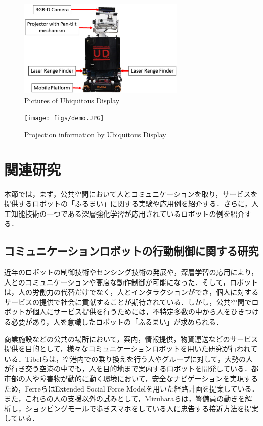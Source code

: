 \documentclass[12pt]{sonota/aislab}
\begin{document}
\begin{figure}[t]
\begin{center}
\includegraphics[clip, width=8cm]{figs/ud_with_kinectv2.eps}
\caption{Pictures of Ubiquitous Display}
\label{UD}
\end{center}
\end{figure}

\begin{figure}[t]
\begin{center}
\texttt{[image: figs/demo.JPG]}
\caption{Projection information by Ubiquitous Display}
\label{projection}
\end{center}
\end{figure}

\section{関連研究}
本節では，まず，公共空間において人とコミュニケーションを取り，サービスを提供するロボットの「ふるまい」に関する実験や応用例を紹介する．さらに，人工知能技術の一つである深層強化学習が応用されているロボットの例を紹介する．

\subsection{コミュニケーションロボットの行動制御に関する研究}
近年のロボットの制御技術やセンシング技術の発展や，深層学習の応用により，人とのコミュニケーションや高度な動作制御が可能になった．そして，ロボットは，人の労働力の代替だけでなく，人とインタラクションができ，個人に対するサービスの提供で社会に貢献することが期待されている．しかし，公共空間でロボットが個人にサービス提供を行うためには，不特定多数の中から人をひきつける必要があり，人を意識したロボットの「ふるまい」が求められる．

商業施設などの公共の場所において，案内，情報提供，物資運送などのサービス提供を目的として，様々なコミュニケーションロボットを用いた研究が行われている．Tibelらは，空港内での乗り換えを行う人やグループに対して，大勢の人が行き交う空港の中でも，人を目的地まで案内するロボットを開発している\cite{spencr}．都市部の人や障害物が動的に動く環境において，安全なナビゲーションを実現するため，FerreらはExtended Social Force Modelを用いた経路計画を提案している\cite{ESTM}．また，これらの人の支援以外の試みとして，Mizuharaらは，警備員の動きを解析し，ショッピングモールで歩きスマホをしている人に忠告する接近方法を提案している\cite{admonishing}．
\end{document}

